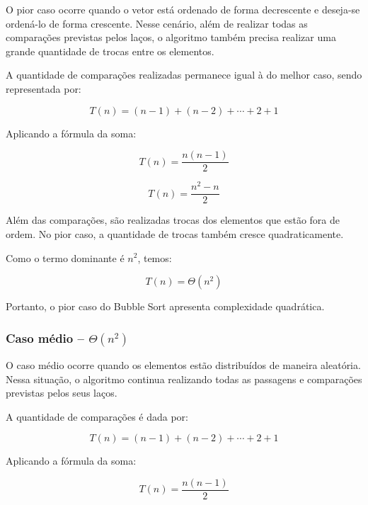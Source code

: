 O pior caso ocorre quando o vetor está ordenado de forma decrescente e
deseja-se ordená-lo de forma crescente. Nesse cenário, além de realizar
todas as comparações previstas pelos laços, o algoritmo também precisa
realizar uma grande quantidade de trocas entre os elementos.

A quantidade de comparações realizadas permanece igual à do melhor caso,
sendo representada por:

\begin{equation}
T(n) = (n-1) + (n-2) + \cdots + 2 + 1
\end{equation}

Aplicando a fórmula da soma:

\begin{equation}
T(n) = \frac{n(n-1)}{2}
\end{equation}

\begin{equation}
T(n) = \frac{n^2-n}{2}
\end{equation}

Além das comparações, são realizadas trocas dos elementos que estão fora
de ordem. No pior caso, a quantidade de trocas também cresce
quadraticamente.

Como o termo dominante é $n^2$, temos:

\begin{equation}
T(n) = \Theta(n^2)
\end{equation}

Portanto, o pior caso do Bubble Sort apresenta complexidade quadrática.

\subsubsection{Caso médio -- \texorpdfstring{$\Theta(n^2)$}{Theta(n²)}}

O caso médio ocorre quando os elementos estão distribuídos de maneira
aleatória. Nessa situação, o algoritmo continua realizando todas as
passagens e comparações previstas pelos seus laços.

A quantidade de comparações é dada por:

\begin{equation}
T(n) = (n-1) + (n-2) + \cdots + 2 + 1
\end{equation}

Aplicando a fórmula da soma:

\begin{equation}
T(n) = \frac{n(n-1)}{2}
\end{equation}

